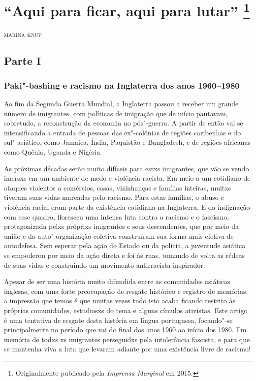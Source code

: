 \chapter[``Aqui para ficar, aqui para lutar'']{``Aqui para ficar, aqui para lutar'' \footnote[*]{Originalmente publicado pela \emph{Imprensa Marginal} em 2015.}}

\hfill{}\textsc{marina knup}

\bigskip

\section{Parte I}

\subsection{Paki"-bashing e racismo na Inglaterra dos anos 1960--1980}

Ao fim da Segunda Guerra Mundial, a Inglaterra passou a receber um grande número de imigrantes, com políticas de imigração que de início pautavam, sobretudo, a reconstrução da economia no pós"-guerra. A partir de então vai se intensificando a entrada de pessoas das ex"-colônias de regiões caribenhas e do sul"-asiático, como Jamaica, Índia, Paquistão e Bangladesh, e de regiões africanas como Quênia, Uganda e Nigéria.

As próximas décadas serão muito difíceis para estxs imigrantes, que vão se vendo imersxs em um ambiente de medo e violência racista. Em meio a um cotidiano de ataques violentos a comércios, casas, vizinhanças e famílias inteiras, muitxs tiveram suas vidas marcadas pelo racismo. Para estas famílias, o abuso e violência racial eram parte da existência cotidiana na Inglaterra. E da indignação com esse quadro, floresceu uma intensa luta contra o racismo e o fascismo, protagonizada pelxs próprixs imigrantes e seus descendentes, que por meio da união e da auto"-organização coletiva construíram sua forma mais efetiva de autodefesa. Sem esperar pela ação do Estado ou da polícia, a juventude asiática se empoderou por meio da ação direta e foi às ruas, tomando de volta as rédeas de suas vidas e construindo um movimento antirracista inspirador.

Apesar de ser uma história muito difundida entre as comunidades asiáticas inglesas, com uma forte preocupação de resgate histórico e registro de memórias, a impressão que temos é que muitas vezes tudo isto acaba ficando restrito às próprias comunidades, estudiosxs do tema e alguns círculos ativistas. Este artigo é uma tentativa de resgate desta história em língua portuguesa, focando"-se principalmente no período que vai do final dos anos 1960 ao início dos 1980. Em memória de todxs xs imigrantes perseguidxs pela intolerância fascista, e para que se mantenha viva a luta que levaram adiante por uma existência livre de racismo!

